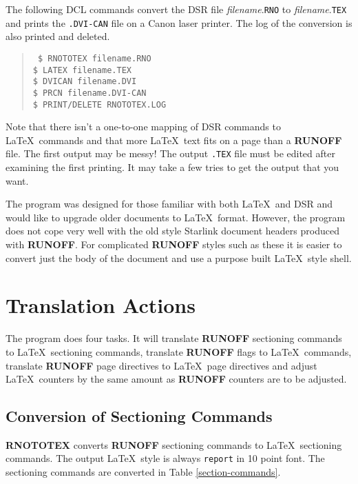 The following DCL commands convert the DSR file {\it filename}.{\tt RNO} to
{\it filename}.{\tt TEX} and  prints the {\tt .DVI-CAN} file on a Canon laser
printer. The log of the conversion is also printed and deleted.

\begin{quote}\tt
\$ RNOTOTEX filename.RNO \\
\$ LATEX filename.TEX \\
\$ DVICAN filename.DVI \\
\$ PRCN filename.DVI-CAN \\
\$ PRINT/DELETE RNOTOTEX.LOG
\end{quote}

Note that there isn't a one-to-one mapping of DSR commands to \LaTeX\  commands
and that more \LaTeX\ text fits on a page than a {\bf RUNOFF} file. The  first
output may be messy!   The output {\tt .TEX} file must be  edited after examining the first printing.  It may take a few tries to
get the output that you want.

The program was designed for those familiar with both \LaTeX\ and DSR and would
like to upgrade older documents to \LaTeX\ format. However, the program does
not cope very well with the old style Starlink document headers produced with
{\bf RUNOFF}. For complicated {\bf RUNOFF} styles such as these it is easier to
convert just the body of the document and use a purpose built \LaTeX\ style
shell.

\section{Translation Actions}

The program does four tasks.  It will translate {\bf RUNOFF} sectioning
commands to \LaTeX\ sectioning commands, translate {\bf RUNOFF} flags to
\LaTeX\ commands, translate {\bf RUNOFF} page directives to \LaTeX\ page
directives and adjust \LaTeX\ counters by the same amount as {\bf RUNOFF}
counters are to be adjusted.

\subsection{Conversion of Sectioning Commands}

{\bf RNOTOTEX} converts {\bf RUNOFF} sectioning commands to \LaTeX\ sectioning
commands.  The output \LaTeX\ style is always {\tt report} in 10 point font.
The sectioning commands are converted in Table \ref{section-commands}.

